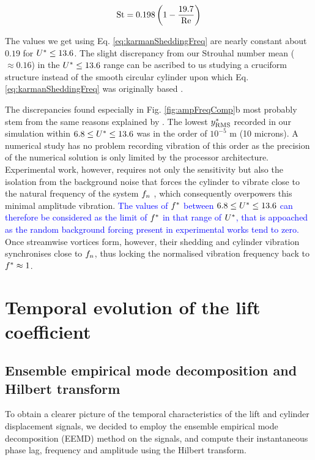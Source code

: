 \documentclass[a4paper,fleqn]{cas-sc}
\begin{document}
\begin{equation}
  \text{St} = 0.198 \left( 1 - \frac{19.7}{\text{Re}} \right)
  \label{eq:karmanSheddingFreq}
\end{equation}

The values we get using Eq. \ref{eq:karmanSheddingFreq} are nearly constant about $0.19$ for  $U^{*} \leq 13.6$. The slight discrepancy from our Strouhal number mean ( $\approx 0.16$) in the   $U^{*} \leq 13.6$ range can be ascribed to us studying a cruciform structure instead of the smooth circular cylinder upon which Eq. \ref{eq:karmanSheddingFreq} was originally based \citep{Blevins1990}.

The discrepancies found especially in Fig. \ref{fig:ampFreqComp}b most probably stem from the same reasons explained by \citet{Nguyen2012}. The lowest  $y^{*}_{\text{RMS}}$ recorded in our simulation within  $6.8 \leq U^{*} \leq 13.6$ was in the order of $10^{-5}$ \si{\metre} (10 microns). A numerical study has no problem recording vibration of this order as the precision of the numerical solution is only limited by the processor architecture. Experimental work, however, requires not only the sensitivity but also the isolation from the background noise that forces the cylinder to vibrate close to the natural frequency of the system  $f_{n}$ \citep{Nguyen2012}, which consequently overpowers this minimal amplitude vibration. \textcolor{blue}{The values of $f^{*}$ between $6.8 \leq U^{*} \leq 13.6$ can therefore be considered as the limit of $f^{*}$ in that range of $U^{*}$, that is appoached as the random background forcing present in experimental works tend to zero.} Once streamwise vortices form, however, their shedding and cylinder vibration synchronises close to $f_{n}$, thus locking the normalised vibration frequency back to  $f^{*} \approx 1$.



\section{Temporal evolution of the lift coefficient} \label{sec:tempEvo}

\subsection{Ensemble empirical mode decomposition and Hilbert transform} \label{ssec:eemd}
To obtain a clearer picture of the temporal characteristics of the lift and cylinder displacement signals, we decided to employ the ensemble empirical mode decomposition (EEMD) method \citep{Huang1998,Wu2008} on the signals, and compute their instantaneous phase lag, frequency and amplitude using the Hilbert transform.
\end{document}
